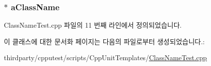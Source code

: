 \subsubsection[{\texorpdfstring{a\+Class\+Name}{aClassName}}]{$\ast$ a\+Class\+Name\hspace{0.3cm}{\ttfamily [private]}}\hypertarget{class_class_name_test_a3bb8b721228c57afb0dc7f11ea9f7a95}{}\label{class_class_name_test_a3bb8b721228c57afb0dc7f11ea9f7a95}


Class\+Name\+Test.\+cpp 파일의 11 번째 라인에서 정의되었습니다.



이 클래스에 대한 문서화 페이지는 다음의 파일로부터 생성되었습니다.\+:\begin{DoxyCompactItemize}
\item 
thirdparty/cpputest/scripts/\+Cpp\+Unit\+Templates/\hyperlink{_cpp_unit_templates_2_class_name_test_8cpp}{Class\+Name\+Test.\+cpp}\end{DoxyCompactItemize}
